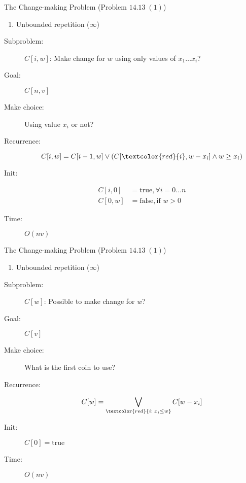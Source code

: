 \begin{frame}{}
  \begin{exampleblock}{The Change-making Problem (Problem $14.13\; (1)$)}
    \begin{enumerate}[(1)]
      \item Unbounded repetition ($\infty$)
    \end{enumerate}
  \end{exampleblock}

  \pause
  \begin{description}
	\item[Subproblem:] $C[i, w]$: Make change for $w$ using only values of $x_{1} \dots x_{i}$?
	\item[Goal:] $C[n,v]$
	  \pause
	\item[Make choice:] Using value $x_{i}$ or not?
	\item[Recurrence:] 
	  \[
		C[i,w] = C[i-1, w] \lor (C[\textcolor{red}{i}, w-x_{i}] \land w \ge x_{i})
	  \]
	  \pause
	\item[Init:]
	  \begin{align*}
		C[i,0] &= \text{true}, \forall i = 0 \dots n  \\
		C[0,w] &= \text{false}, \text{if } w > 0
	  \end{align*}
	\item[Time:] $O(nv)$
  \end{description}
\end{frame}
\begin{frame}{}
  \begin{exampleblock}{The Change-making Problem (Problem $14.13\; (1)$)}
    \begin{enumerate}[(1)]
      \item Unbounded repetition ($\infty$)
    \end{enumerate}
  \end{exampleblock}

  \pause
  \begin{description}
	\item[Subproblem:] $C[w]$: Possible to make change for $w$?
	\item[Goal:] $C[v]$
	  \pause
	\item[Make choice:] What is the first coin to use?
	\item[Recurrence:] 
	  \[
		C[w] = \bigvee_{\textcolor{red}{i: \; x_i \le w}} C[w-x_i]
	  \]
	  \pause
	\item[Init:] $C[0] = \text{true}$
	\item[Time:] $O(nv)$
  \end{description}
\end{frame}
